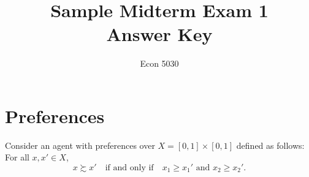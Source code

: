 \title{Sample Midterm Exam 1\ifsol\\[4pt]\large Answer Key\fi}
\author{Econ 5030}
\date{}


\maketitle
\thispagestyle{myheadings}

\section{Preferences}

\noindent Consider an agent with preferences over $X=[0,1]\times[0,1]$ defined as follows: For all $x,x'\in X$,
\[
x \succsim x' \quad\text{if and only if}\quad x_1 \ge x_1' \text{ and } x_2 \ge x_2'.
\]

